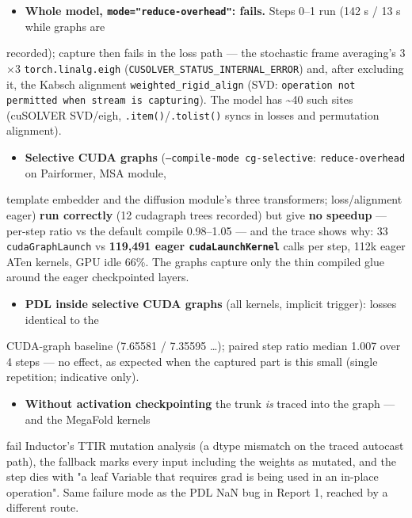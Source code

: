 \documentclass[10pt]{article}
\begin{document}
\begin{itemize}
\item \textbf{Whole model, \texttt{mode="reduce-overhead"}: fails.} Steps 0--1 run (142 s / 13 s while graphs are
\end{itemize}
recorded); capture then fails in the loss path --- the stochastic frame averaging's 3$\times$3 \texttt{torch.linalg.eigh} (\texttt{CUSOLVER\_STATUS\_INTERNAL\_ERROR}) and, after excluding it, the Kabsch alignment \texttt{weighted\_rigid\_align} (SVD: \texttt{operation not permitted when stream is capturing}). The model has \textasciitilde{}40 such sites (cuSOLVER SVD/eigh, \texttt{.item()}/\texttt{.tolist()} syncs in losses and permutation alignment).

\begin{itemize}
\item \textbf{Selective CUDA graphs} (\texttt{--compile-mode cg-selective}: \texttt{reduce-overhead} on Pairformer, MSA module,
\end{itemize}
template embedder and the diffusion module's three transformers; loss/alignment eager) \textbf{run correctly} (12 cudagraph trees recorded) but give \textbf{no speedup} --- per-step ratio vs the default compile 0.98--1.05 --- and the trace shows why: 33 \texttt{cudaGraphLaunch} vs \textbf{119,491 eager \texttt{cudaLaunchKernel}} calls per step, 112k eager ATen kernels, GPU idle 66\%. The graphs capture only the thin compiled glue around the eager checkpointed layers.

\begin{itemize}
\item \textbf{PDL inside selective CUDA graphs} (all kernels, implicit trigger): losses identical to the
\end{itemize}
CUDA-graph baseline (7.65581 / 7.35595 \ldots{}); paired step ratio median 1.007 over 4 steps --- no effect, as expected when the captured part is this small (single repetition; indicative only).

\begin{itemize}
\item \textbf{Without activation checkpointing} the trunk \emph{is} traced into the graph --- and the MegaFold kernels
\end{itemize}
fail Inductor's TTIR mutation analysis (a dtype mismatch on the traced autocast path), the fallback marks every input including the weights as mutated, and the step dies with "a leaf Variable that requires grad is being used in an in-place operation". Same failure mode as the PDL NaN bug in Report 1, reached by a different route.
\end{document}
